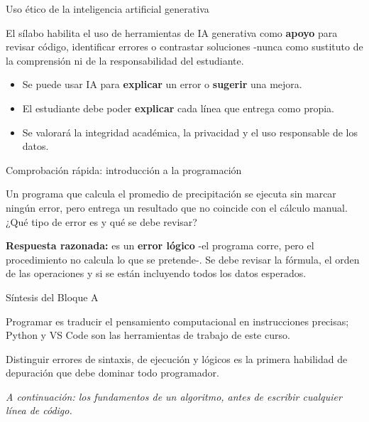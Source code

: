 \documentclass[aspectratio=169,11pt]{beamer}
\begin{document}
\begin{frame}{Uso ético de la inteligencia artificial generativa}
\small
\begin{envbox}[title=Contexto del curso]
El sílabo habilita el uso de herramientas de IA generativa como \textbf{apoyo} para revisar código, identificar errores o contrastar soluciones -nunca como sustituto de la comprensión ni de la responsabilidad del estudiante.
\end{envbox}
\vspace{0.1cm}
\begin{itemize}[itemsep=1pt]
  \item Se puede usar IA para \textbf{explicar} un error o \textbf{sugerir} una mejora.
  \item El estudiante debe poder \textbf{explicar} cada línea que entrega como propia.
  \item Se valorará la integridad académica, la privacidad y el uso responsable de los datos.
\end{itemize}
\end{frame}

\begin{frame}{Comprobación rápida: introducción a la programación}
\begin{checkbox}
Un programa que calcula el promedio de precipitación se ejecuta sin marcar ningún error, pero entrega un resultado que no coincide con el cálculo manual. ¿Qué tipo de error es y qué se debe revisar?
\end{checkbox}
\vspace{0.2cm}
\begin{keybox}[top=2pt,bottom=2pt]
\footnotesize\textbf{Respuesta razonada:} es un \textbf{error lógico} -el programa corre, pero el procedimiento no calcula lo que se pretende-. Se debe revisar la fórmula, el orden de las operaciones y si se están incluyendo todos los datos esperados.
\end{keybox}
\end{frame}

\begin{frame}{Síntesis del Bloque A}
\begin{keybox}[top=2pt,bottom=2pt]
\footnotesize Programar es traducir el pensamiento computacional en instrucciones precisas; Python y VS Code son las herramientas de trabajo de este curso.
\end{keybox}
\begin{keybox}[top=2pt,bottom=2pt]
\footnotesize Distinguir errores de sintaxis, de ejecución y lógicos es la primera habilidad de depuración que debe dominar todo programador.
\end{keybox}
\vspace{0.1cm}
\textit{A continuación: los fundamentos de un algoritmo, antes de escribir cualquier línea de código.}
\end{frame}
\end{document}
